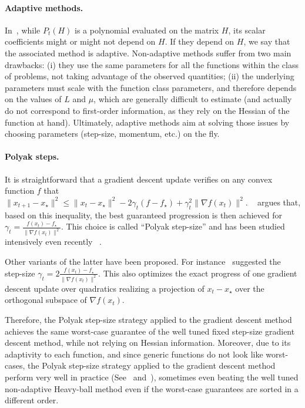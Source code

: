 \documentclass{article}
\newcommand{\xs}{x_\star}
\renewcommand{\leq}{\leqslant}
\begin{document}
    \paragraph{Adaptive methods.}
    In~, while $P_t(H)$ is a polynomial evaluated on the matrix $H$,
    its scalar coefficients might or might not depend on $H$.
    If they depend on $H$, we say that the associated method is adaptive.
    Non-adaptive methods suffer from two main drawbacks:
    (i) they use the same parameters for all the functions within the class of problems, not taking advantage of the observed quantities;
    (ii) the underlying parameters must scale with the function class parameters, and therefore depends on the values of $L$ and $\mu$,
    which are generally difficult to estimate (and actually do not correspond to first-order information, as they rely on the Hessian of the function at hand).
    Ultimately, adaptive methods aim at solving those issues by choosing parameters (step-size, momentum, etc.) on the fly.

    \paragraph{Polyak steps.}

    It is straightforward that a gradient descent update verifies on any convex function $f$ that $\|x_{t+1} - \xs\|^2 \leq \|x_t - \xs\|^2 - 2\gamma_t (f-f_\star) + \gamma_t^2\|\nabla f(x_t)\|^2$.
    ~\cite{polyakintroduction} argues that, based on this inequality, the best guaranteed progression is then achieved for $\gamma_t = \frac{f(x_t) - f_\star}{\|\nabla f(x_t)\|^2}$.
    This choice is called ``Polyak step-size'' and has been studied intensively even recently ~\cite{loizou2021stochastic,gower2022cutting}.

    Other variants of the latter have been proposed.
    For instance~\citep[Variant 1]{barre2020complexity} suggested the step-size $\gamma_t = 2\frac{f(x_t) - f_\star}{\|\nabla f(x_t)\|^2}$.
    This also optimizes the exact progress of one gradient descent update over quadratics realizing a projection of $x_t-\xs$ over the orthogonal subspace of $\nabla f(x_t)$.

    Therefore, the Polyak step-size strategy applied to the gradient descent method achieves the same worst-case guarantee of the well tuned fixed step-size gradient descent method,
    while not relying on Hessian information.
    Moreover, due to its adaptivity to each function, and since generic functions do not look like worst-cases,
    the Polyak step-size strategy applied to the gradient descent method perform very well in practice (See~ and~\citep[Figure 1]{barre2020complexity}),
    sometimes even beating the well tuned non-adaptive Heavy-ball method even if the worst-case guarantees are sorted in a different order.
\end{document}
